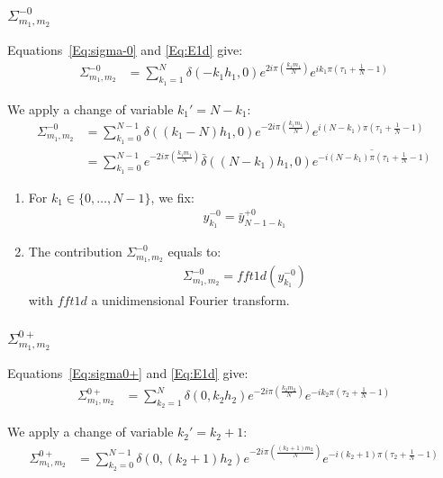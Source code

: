 \subsubsection{\texorpdfstring{$\Sigma_{m_1,m_2}^{-0}$}{sigma-0}}
Equations~\eqref{Eq:sigma-0} and \eqref{Eq:E1d} give:
\begin{align*}
\Sigma_{m_1,m_2}^{-0}&=\sum_{k_1=1}^{N}\delta\left(-k_1h_1,0\right)
    e^{2i\pi\left(\frac{k_1m_1}{N}\right)}
    e^{ik_1\pi\left(\tau_1+\frac{1}{N}-1\right)}
\end{align*}

We apply a change of variable $k_1'=N-k_1$:
\begin{align*}
\Sigma_{m_1,m_2}^{-0}&=\sum_{k_1=0}^{N-1}
  \delta\left((k_1-N)h_1,0\right) e^{-2i\pi\left(\frac{k_1m_1}{N}\right)}
    e^{i(N-k_1)\pi\left(\tau_1+\frac{1}{N}-1\right)} \\
 &=\sum_{k_1=0}^{N-1}
    e^{-2i\pi\left(\frac{k_1m_1}{N}\right)}
  \bar{\delta}\left((N-k_1)h_1,0\right)
   \overline{e^{-i(N-k_1)\pi\left(\tau_1+\frac{1}{N}-1\right)}}
\end{align*}

\begin{enumerate}
\item For $k_1\in\{0,\hdots,N-1\}$, we fix:
\begin{align*}
y^{-0}_{k_1}= \bar{y}^{+0}_{N-1-k_1}
\end{align*}
\item The contribution $\Sigma_{m_1,m_2}^{-0}$ equals to:
\begin{align*}
  \Sigma_{m_1,m_2}^{-0}=fft1d(y^{-0}_{k_1})
\end{align*}
with $fft1d$ a unidimensional Fourier transform.
\end{enumerate}

\subsubsection{\texorpdfstring{$\Sigma_{m_1,m_2}^{0+}$}{sigma0+}}
Equations~\eqref{Eq:sigma0+} and \eqref{Eq:E1d} give:
\begin{align*}
\Sigma_{m_1,m_2}^{0+}&=\sum_{k_2=1}^{N}\delta\left(0,k_2h_2\right)
    e^{-2i\pi\left(\frac{k_2m_2}{N}\right)}
    e^{-ik_2\pi\left(\tau_2+\frac{1}{N}-1\right)}
\end{align*}

We apply a change of variable $k_2'=k_2+1$:
\begin{align*}
\Sigma_{m_1,m_2}^{0+}&=\sum_{k_2=0}^{N-1}
  \delta\left(0,(k_2+1)h_2\right) e^{-2i\pi\left(\frac{(k_2+1)m_2}{N}\right)}
    e^{-i(k_2+1)\pi\left(\tau_2+\frac{1}{N}-1\right)}
\end{align*}

